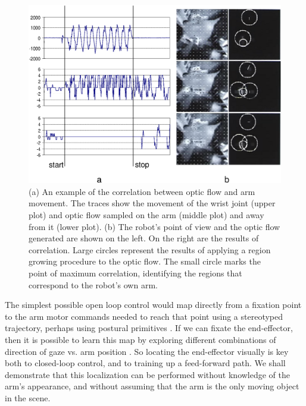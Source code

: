 \begin{figure}[tb]
\begin{center}
\includegraphics[width=12cm]{arm-detection-all.eps}
\caption{ 
\label{fig:arm-detection}
%
(a) An example of the correlation between optic flow and arm movement.
The traces show the movement of the wrist joint (upper plot)
and optic flow sampled on the arm (middle plot) and away from it (lower
plot). (b) The robot's point of view and the optic flow generated are 
shown on the left. On the right are the results of correlation.  
Large circles represent the results of applying a region growing 
procedure to the optic flow. The small circle marks the point of maximum 
correlation, identifying the regions that correspond to the robot's own arm.
%
}
\end{center}
\end{figure}


The simplest possible open loop control would map directly from a
fixation point to the arm motor commands needed to reach that point
\cite{metta99developmental} using a stereotyped trajectory, perhaps
using postural primitives \cite{mussa-ivaldi92vector}.  If we can
fixate the end-effector, then it is possible to learn this map by
exploring different combinations of direction of gaze vs.  arm
position \cite{Marjanovic-96-SAB,metta99developmental}.  So locating
the end-effector visually is key both to closed-loop control, and to
training up a feed-forward path.  We shall demonstrate that this
localization can be performed without knowledge of the arm's appearance,
and without assuming that the arm is the only moving object in the
scene.

